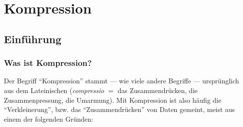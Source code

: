 \chapter{Kompression}\label{ch:Lektion}
\section{Einführung}

\subsection{Was ist Kompression?}

Der Begriff \enquote{Kompression} stammt --- wie viele andere Begriffe --- ursprünglich aus dem Lateinischen (\textit{compressio} $=$ das Zusammendrücken, die Zusammenpressung, die Umarmung). Mit Kompression ist also häufig die \enquote{Verkleinerung}, bzw. das \enquote{Zusammendrücken} von Daten gemeint, meist aus einem der folgenden Gründen:

